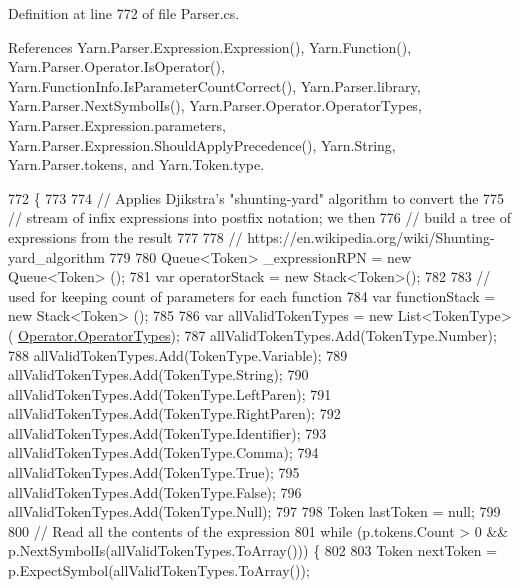 Definition at line 772 of file Parser.\-cs.



References Yarn.\-Parser.\-Expression.\-Expression(), Yarn.\-Function(), Yarn.\-Parser.\-Operator.\-Is\-Operator(), Yarn.\-Function\-Info.\-Is\-Parameter\-Count\-Correct(), Yarn.\-Parser.\-library, Yarn.\-Parser.\-Next\-Symbol\-Is(), Yarn.\-Parser.\-Operator.\-Operator\-Types, Yarn.\-Parser.\-Expression.\-parameters, Yarn.\-Parser.\-Expression.\-Should\-Apply\-Precedence(), Yarn.\-String, Yarn.\-Parser.\-tokens, and Yarn.\-Token.\-type.


\begin{DoxyCode}
772                                                                          \{
773 
774                 \textcolor{comment}{// Applies Djikstra's "shunting-yard" algorithm to convert the}
775                 \textcolor{comment}{// stream of infix expressions into postfix notation; we then}
776                 \textcolor{comment}{// build a tree of expressions from the result}
777 
778                 \textcolor{comment}{// https://en.wikipedia.org/wiki/Shunting-yard\_algorithm}
779 
780                 Queue<Token> \_expressionRPN = \textcolor{keyword}{new} Queue<Token> ();
781                 var operatorStack = \textcolor{keyword}{new} Stack<Token>();
782 
783                 \textcolor{comment}{// used for keeping count of parameters for each function}
784                 var functionStack = \textcolor{keyword}{new} Stack<Token> ();
785 
786                 var allValidTokenTypes = \textcolor{keyword}{new} List<TokenType>(
      \hyperlink{a00137_ad8a4bb1b46dbc3d1b7708e78a2d97e1c}{Operator.OperatorTypes});
787                 allValidTokenTypes.Add(TokenType.Number);
788                 allValidTokenTypes.Add(TokenType.Variable);
789                 allValidTokenTypes.Add(TokenType.String);
790                 allValidTokenTypes.Add(TokenType.LeftParen);
791                 allValidTokenTypes.Add(TokenType.RightParen);
792                 allValidTokenTypes.Add(TokenType.Identifier);
793                 allValidTokenTypes.Add(TokenType.Comma);
794                 allValidTokenTypes.Add(TokenType.True);
795                 allValidTokenTypes.Add(TokenType.False);
796                 allValidTokenTypes.Add(TokenType.Null);
797 
798                 Token lastToken = null;
799 
800                 \textcolor{comment}{// Read all the contents of the expression}
801                 \textcolor{keywordflow}{while} (p.tokens.Count > 0 && p.NextSymbolIs(allValidTokenTypes.ToArray())) \{
802 
803                     Token nextToken = p.ExpectSymbol(allValidTokenTypes.ToArray());

\end{DoxyCode}
